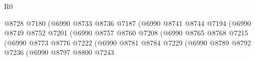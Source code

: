 \begin{lexlean}{R0}
\begin{coremodule}
                                                      @8728
                                                      @7180
                                                      (@6990
                                                        @8733
                                                        @8736
                                                        @7187
                                                        (@6990
                                                          @8741
                                                          @8744
                                                          @7194
                                                          (@6990
                                                            @8749
                                                            @8752
                                                            @7201
                                                            (@6990
                                                              @8757
                                                              @8760
                                                              @7208
                                                              (@6990
                                                                @8765
                                                                @8768
                                                                @7215
                                                                (@6990
                                                                  @8773
                                                                  @8776
                                                                  @7222
                                                                  (@6990
                                                                    @8781
                                                                    @8784
                                                                    @7229
                                                                    (@6990
                                                                      @8789
                                                                      @8792
                                                                      @7236
                                                                      (@6990
                                                                        @8797
                                                                        @8800
                                                                        @7243

\end{coremodule}
\end{lexlean}
